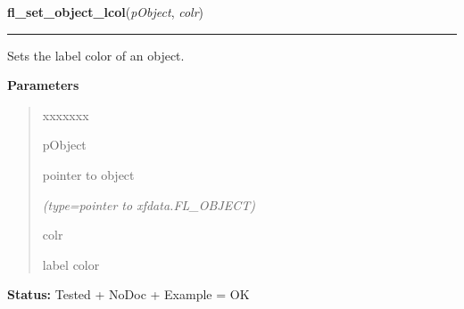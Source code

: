 \hspace{.8\funcindent}\begin{boxedminipage}{\funcwidth}

    \raggedright \textbf{fl\_set\_object\_lcol}(\textit{pObject}, \textit{colr})

    \vspace{-1.5ex}

    \rule{\textwidth}{0.5\fboxrule}
\setlength{\parskip}{2ex}
    Sets the label color of an object.

\setlength{\parskip}{1ex}
      \textbf{Parameters}
      \vspace{-1ex}

      \begin{quote}
        \begin{Ventry}{xxxxxxx}

          \item[pObject]

          pointer to object

            {\it (type=pointer to xfdata.FL\_OBJECT)}

          \item[colr]

          label color

        \end{Ventry}

      \end{quote}

\textbf{Status:} Tested + NoDoc + Example = OK



    \end{boxedminipage}

    \label{xformslib:library:fl_set_object_lcol}

    \vspace{0.5ex}

